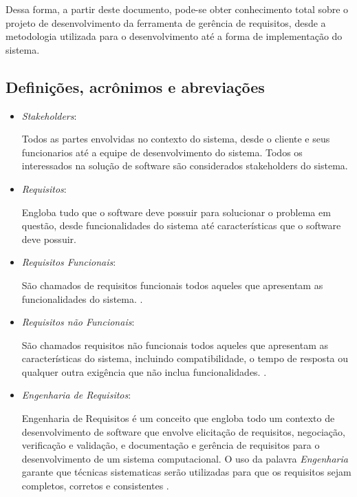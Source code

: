 Dessa forma, a partir deste documento, pode-se obter conhecimento total sobre o projeto de desenvolvimento da ferramenta de gerência de requisitos, desde a metodologia utilizada para o desenvolvimento até a forma de implementação do sistema.

\subsection{Definições, acrônimos e abreviações}

\begin{itemize}
	\item \textit{Stakeholders}:

		Todos as partes envolvidas no contexto do sistema, desde o cliente e seus funcionarios até a equipe de desenvolvimento do sistema. Todos os interessados na solução de software são considerados stakeholders do sistema.

	\item \textit{Requisitos}: 

		Engloba tudo que o software deve possuir para solucionar o problema em questão, desde funcionalidades do sistema até características que o software deve possuir.

	\item \textit{Requisitos Funcionais}:

		São chamados de requisitos funcionais todos aqueles que apresentam as funcionalidades do sistema. \cite{sommerville2003engenharia}.

	\item \textit{Requisitos não Funcionais}:

		São chamados requisitos não funcionais todos aqueles que apresentam as características do sistema, incluindo compatibilidade, o tempo de resposta ou qualquer outra exigência que não inclua funcionalidades. \cite{sommerville2003engenharia}.

	\item \textit{Engenharia de Requisitos}:

		Engenharia de Requisitos é um conceito que engloba todo um contexto de desenvolvimento de software que envolve elicitação de requisitos, negociação, verificação e validação, e documentação e gerência de requisitos para o desenvolvimento de um sistema computacional. O uso da palavra \textit{Engenharia} garante que técnicas sistematicas serão utilizadas para que os requisitos sejam completos, corretos e consistentes \cite{de2004analise}. 


\end{itemize}
